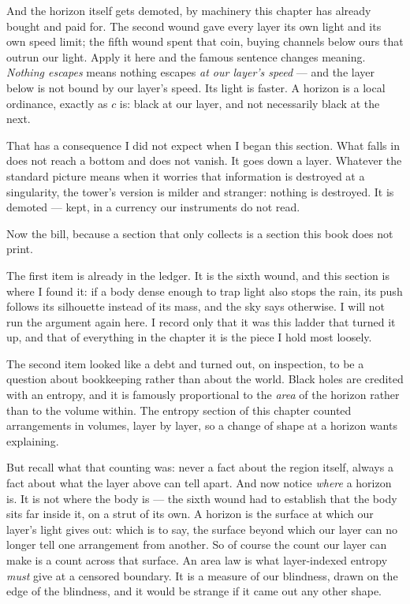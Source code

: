 And the horizon itself gets demoted, by machinery this chapter has already bought and paid for. The second wound gave every layer its own light and its own speed limit; the fifth wound spent that coin, buying channels below ours that outrun our light. Apply it here and the famous sentence changes meaning. \emph{Nothing escapes} means nothing escapes \emph{at our layer's speed} --- and the layer below is not bound by our layer's speed. Its light is faster. A horizon is a local ordinance, exactly as $c$ is: black at our layer, and not necessarily black at the next.

That has a consequence I did not expect when I began this section. What falls in does not reach a bottom and does not vanish. It goes down a layer. Whatever the standard picture means when it worries that information is destroyed at a singularity, the tower's version is milder and stranger: nothing is destroyed. It is demoted --- kept, in a currency our instruments do not read.

Now the bill, because a section that only collects is a section this book does not print.

The first item is already in the ledger. It is the sixth wound, and this section is where I found it: if a body dense enough to trap light also stops the rain, its push follows its silhouette instead of its mass, and the sky says otherwise. I will not run the argument again here. I record only that it was this ladder that turned it up, and that of everything in the chapter it is the piece I hold most loosely.

The second item looked like a debt and turned out, on inspection, to be a question about bookkeeping rather than about the world. Black holes are credited with an entropy, and it is famously proportional to the \emph{area} of the horizon rather than to the volume within. The entropy section of this chapter counted arrangements in volumes, layer by layer, so a change of shape at a horizon wants explaining.

But recall what that counting was: never a fact about the region itself, always a fact about what the layer above can tell apart. And now notice \emph{where} a horizon is. It is not where the body is --- the sixth wound had to establish that the body sits far inside it, on a strut of its own. A horizon is the surface at which our layer's light gives out: which is to say, the surface beyond which our layer can no longer tell one arrangement from another. So of course the count our layer can make is a count across that surface. An area law is what layer-indexed entropy \emph{must} give at a censored boundary. It is a measure of our blindness, drawn on the edge of the blindness, and it would be strange if it came out any other shape.

